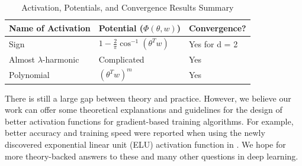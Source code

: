 


%

%
%
 \begin{table}[tb]
 \caption{Activation, Potentials, and Convergence Results Summary}
 \label{table1}
 \noindent
 \vskip 0.1in
 \begin{center}
 \begin{small}
 \begin{sc}
 \begin{tabular}{
   |p{}%
   |p{}%
   |p{}|%
   }
    \hline 
         Name of Activation&  Potential  ($\Phi(\theta,w)$)    & Convergence? \\ \hline 
         Sign & $1 - \frac{2}{\pi}\cos^{-1}(\theta^Tw)$       & Yes for d = 2 \\ 
          Almost   $\lambda$-harmonic  & Complicated & Yes \\
Polynomial  & $(\theta^Tw)^m$       & Yes  \\        
         \hline
 \end{tabular}
 \end{sc}
 \end{small}
 \end{center}
 \vskip -0.1in
 \end{table} 


There is still a large gap between theory and practice. However, we believe our work can offer some theoretical explanations and guidelines for the design of better activation functions for gradient-based training algorithms. For example, better accuracy and training speed were reported when using the newly discovered exponential linear unit (ELU) activation function in \cite{ClevertUH15, ShahKSS16}. We hope for more theory-backed answers to these and many other questions in deep learning.



